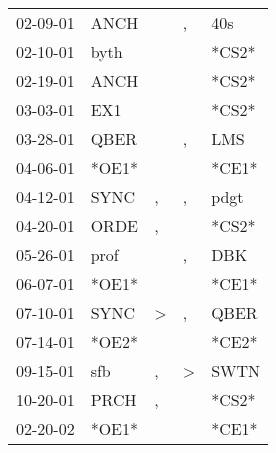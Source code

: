 \begin{supertabular}{p{0.07\textwidth}p{0.06\textwidth}p{0.02\textwidth}p{0.02\textwidth}p{0.06\textwidth}}
 02-09-01\textsuperscript{} &           ANCH\textsuperscript{} &               &             , &   40s\textsuperscript{} \\
 02-10-01\textsuperscript{} &           byth\textsuperscript{} &               &               &                   *CS2* \\
 02-19-01\textsuperscript{} &           ANCH\textsuperscript{} &               &               &                   *CS2* \\
 03-03-01\textsuperscript{} &            EX1\textsuperscript{} &               &               &                   *CS2* \\
 03-28-01\textsuperscript{} &           QBER\textsuperscript{} &               &             , &   LMS\textsuperscript{} \\
 04-06-01\textsuperscript{} &                            *OE1* &               &               &                   *CE1* \\
 04-12-01\textsuperscript{} &           SYNC\textsuperscript{} &             , &             , &  pdgt\textsuperscript{} \\
 04-20-01\textsuperscript{} &           ORDE\textsuperscript{} &             , &               &                   *CS2* \\
 05-26-01\textsuperscript{} &           prof\textsuperscript{} &               &             , &   DBK\textsuperscript{} \\
 06-07-01\textsuperscript{} &                            *OE1* &               &               &                   *CE1* \\
 07-10-01\textsuperscript{} &           SYNC\textsuperscript{} &  \textgreater &             , &  QBER\textsuperscript{} \\
 07-14-01\textsuperscript{} &                            *OE2* &               &               &                   *CE2* \\
 09-15-01\textsuperscript{} &            sfb\textsuperscript{} &             , &  \textgreater &  SWTN\textsuperscript{} \\
 10-20-01\textsuperscript{} &           PRCH\textsuperscript{} &             , &               &                   *CS2* \\
 02-20-02\textsuperscript{} &                            *OE1* &               &               &                   *CE1* \\

\end{supertabular}
